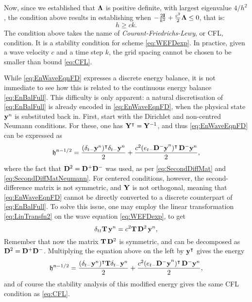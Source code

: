 Now, since we established that ${\bf \Lambda}$ is positive definite, with largest eigenvalue $4/h^2$, the condition above results in establishing when $-\frac{2{\bf I}}{k^2} + \frac{c^2}{2}{\bf \Lambda}\leq 0$, that is:
\begin{equation}\label{eq:CFL}
h\geq ck.
\end{equation}
The condition  above takes the name of \emph{Courant-Friedrichs-Lewy}, or CFL, condition. It is a stability condition for scheme  \eqref{eq:WEFDexp}. In practice, given a wave velocity $c$ and a time step $k$, the grid spacing cannot be chosen to be smaller than bound \eqref{eq:CFL}.



While \eqref{eq:EnWaveEqnFD} expresses a discrete energy balance, it is not immediate to see how this is related to the continuous energy balance \eqref{eq:EnBalFull}. This difficulty is only apparent: a natural discretisation of \eqref{eq:EnBalFull} is already encoded in \eqref{eq:EnWaveEqnFD}, when the physical state ${\bf y}^n$ is substituted back in. First, start with the Dirichlet and non-centred Neumann conditions. For these, one has ${\bf Y}^\intercal = {\bf Y}^{-1}$, and thus \eqref{eq:EnWaveEqnFD} can be expressed as
\begin{equation}
{\mathfrak h}^{n-1/2} = \frac{(\delta_{t-} {\bf y}^n)^\intercal \delta_{t-} {\bf y}^n}{2} + \frac{c^2(e_{t-} {\bf {\bf D}^-{\bf y}}^n)^\intercal \, {\bf D}^-{\bf y}^n}{2},
\end{equation}
where the fact that ${\bf D}^2 = {\bf D}^+{\bf D}^-$ was used, as per \eqref{eq:SecondDiffMat} and \eqref{eq:SecondDiffMatNeumann}. For centered conditions, however, the second-difference matrix is not symmetric, and ${\bf Y}$ is not orthogonal, meaning that \eqref{eq:EnWaveEqnFD} cannot be directly converted to a discrete counterpart of \eqref{eq:EnBalFull}. To solve this issue, one may employ the linear transformation \eqref{eq:LinTransfn2} on the wave equation \eqref{eq:WEFDexp}, to get 
\begin{equation}
\delta_{tt} {\bf T}\,{\bf y}^n = c^2 {\bf T}\,{\bf D}^2 \,{\bf y}^n,
\end{equation}
Remember that now the matrix ${\bf T}\,{\bf D}^2$ is symmetric, and can be decomposed as ${\bf D}^2 = {\bf D}^+{\bf D}^-$. Multiplying the equation above on the left by ${\bf y}^\intercal$ gives the energy
\begin{equation}
{\mathfrak h}^{n-1/2} = \frac{(\delta_{t-} {\bf y}^n)^\intercal {\bf T} \delta_{t-} {\bf y}^n}{2} + \frac{c^2(e_{t-} {\bf {\bf D}^-{\bf y}}^n)^\intercal \, {\bf D}^-{\bf y}^n}{2},
\end{equation}
and of course the stability analysis of this modified energy gives the same CFL condition as \eqref{eq:CFL}.



